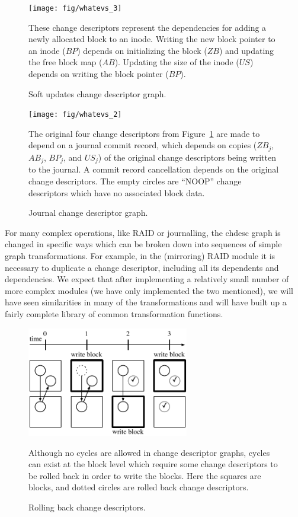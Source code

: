 \begin{figure}[b]
  \centering
  \texttt{[image: fig/whatevs\_3]}
  \caption{\label{fig:softupdates} Soft updates change descriptor graph.}{These
  change descriptors represent the dependencies for adding a newly allocated
  block to an inode. Writing the new block pointer to an inode ($BP$) depends
  on initializing the block ($ZB$) and updating the free block map ($AB$).
  Updating the size of the inode ($US$) depends on writing the block pointer
  ($BP$).
}
\end{figure}

\begin{figure}
  \centering
  \texttt{[image: fig/whatevs\_2]}
  \caption{\label{fig:journal} Journal change descriptor graph.}{The original
  four change descriptors from Figure~\ref{fig:softupdates} are made to depend
  on a journal commit record, which depends on copies ($ZB_j$, $AB_j$, $BP_j$,
  and $US_j$) of the original change descriptors being written to the journal. A
  commit record cancellation depends on the original change descriptors. The
  empty circles are ``NOOP'' change descriptors which have no associated block
  data.
}
\end{figure}

For many complex operations, like RAID or journalling, the chdesc graph is
changed in specific ways which can be broken down into sequences of simple graph
transformations. For example, in the (mirroring) RAID module it is necessary to
duplicate a change descriptor, including all its dependents and dependencies. We
expect that after implementing a relatively small number of more complex modules
(we have only implemented the two mentioned), we will have seen similarities in
many of the transformations and will have built up a fairly complete library of
common transformation functions.

\begin{figure}
  \centering
  \includegraphics[width=200pt]{rollback_sequence}
  \caption{\label{fig:rollback} Rolling back change descriptors.}{Although no
  cycles are allowed in change descriptor graphs, cycles can exist at the block
  level which require some change descriptors to be rolled back in order to
  write the blocks. Here the squares are blocks, and dotted circles are rolled
  back change descriptors.
}
\end{figure}
